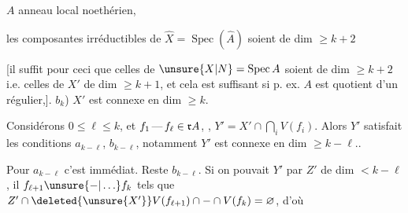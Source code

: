  \quad $A$ anneau local noethérien, 

  les composantes irréductibles de $\widehat X=\operatorname{Spec}(\widehat A)$ soient de dim $\geq k+2$

[il suffit pour ceci que celles de $\unsure{X|N}=\operatorname{Spec} A$ soient de dim $\geq k+2$ i.e. celles de $X'$ de dim $\geq k+1$, et cela est suffisant si p. ex. $A$ est quotient d'un régulier,].  $b_k$) $X'$ est connexe en dim $\geq k$.

Considérons  $0\leq\ell\leq k$, et $f_1\mathinner{\text{---}}f_\ell\in\mathfrak rA$, , $Y'=X'\cap\bigcap\limits_i V(f_i)$. Alors  $Y'$ satisfait les conditions $a_{k-\ell}$, $b_{k-\ell}$, notamment $Y'$ est connexe en dim $\geq k-\ell$..

Pour $a_{k-\ell}$ c'est immédiat. Reste $b_{k-\ell}$. Si on pouvait  $Y'$ par $Z'$ de dim $<k-\ell$, il   $f_{\ell+1}\unsure{-|\ldots}f_k$ tels que $Z'\cap\deleted{\unsure{X'}}V(f_{\ell+1})\cap-\cap V(f_k)=\varnothing$, d'où 

